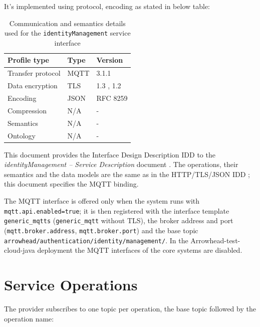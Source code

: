 \documentclass[a4paper]{arrowhead}
\begin{document}
It's implemented using protocol, encoding as stated in below table:
\begin{table}[ht!]
  \centering
  \begin{tabular}{|l|l|l|}
    \hline
    \rowcolor{gray!33} Profile type & Type & Version \\ \hline
    Transfer protocol & MQTT & 3.1.1 \cite{mqtt311} \\ \hline
    Data encryption & TLS & 1.3 \cite{rfc8446}, 1.2 \cite{rfc5246} \\ \hline
    Encoding & JSON & RFC 8259 \cite{rfc8259} \\ \hline
    Compression & N/A & - \\ \hline
    Semantics & N/A & - \\ \hline
    Ontology & N/A & - \\ \hline
  \end{tabular}
  \caption{Communication and semantics details used for the \texttt{identityManagement} service interface}
  \label{tab:comunication_semantics_profile}
\end{table}

This document provides the Interface Design Description IDD to the \textit{identityManagement -- Service Description} document \cite{auth-identityManagement-sd}.
The operations, their semantics and the data models are the same as in the HTTP/TLS/JSON IDD \cite{auth-identityManagement-http-idd}; this document specifies the MQTT binding.

The MQTT interface is offered only when the system runs with \texttt{mqtt.api.enabled=true}; it is then registered with the interface template \texttt{generic\_\allowbreak{}mqtts} (\texttt{generic\_\allowbreak{}mqtt} without TLS), the broker address and port (\texttt{mqtt.\allowbreak{}broker.\allowbreak{}address}, \texttt{mqtt.\allowbreak{}broker.\allowbreak{}port}) and the base topic \texttt{arrowhead/\allowbreak{}authentication/\allowbreak{}identity/\allowbreak{}management/\allowbreak{}}. In the Arrowhead-test-cloud-java deployment the MQTT interfaces of the core systems are disabled.

\newpage

\section{Service Operations}
\label{sec:operations}

The provider subscribes to one topic per operation, the base topic followed by the operation name:
\end{document}
